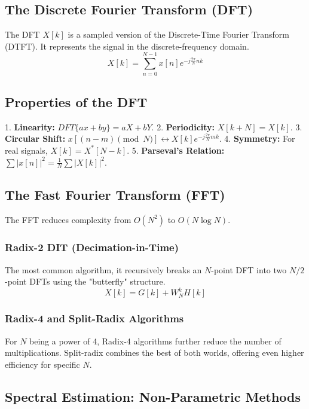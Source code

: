 
\subsection{The Discrete Fourier Transform (DFT)}
The DFT $X[k]$ is a sampled version of the Discrete-Time Fourier Transform (DTFT). It represents the signal in the discrete-frequency domain.
\begin{equation}
    X[k] = \sum_{n=0}^{N-1} x[n] e^{-j\frac{2\pi}{N}nk}
\end{equation}

\subsection{Properties of the DFT}
1. \textbf{Linearity:} $DFT\{ax + by\} = aX + bY$.
2. \textbf{Periodicity:} $X[k+N] = X[k]$.
3. \textbf{Circular Shift:} $x[(n-m) \pmod N] \leftrightarrow X[k]e^{-j\frac{2\pi}{N}mk}$.
4. \textbf{Symmetry:} For real signals, $X[k] = X^*[N-k]$.
5. \textbf{Parseval's Relation:} $\sum |x[n]|^2 = \frac{1}{N} \sum |X[k]|^2$.

\subsection{The Fast Fourier Transform (FFT)}
The FFT reduces complexity from $O(N^2)$ to $O(N \log N)$. 

\subsubsection{Radix-2 DIT (Decimation-in-Time)}
The most common algorithm, it recursively breaks an $N$-point DFT into two $N/2$-point DFTs using the "butterfly" structure.
\begin{equation}
    X[k] = G[k] + W_N^k H[k]
\end{equation}

\subsubsection{Radix-4 and Split-Radix Algorithms}
For $N$ being a power of 4, Radix-4 algorithms further reduce the number of multiplications. Split-radix combines the best of both worlds, offering even higher efficiency for specific $N$.

\subsection{Spectral Estimation: Non-Parametric Methods}
